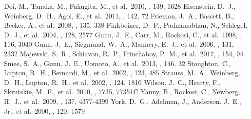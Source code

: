 \begin{thebibliography}{}
 Doi, M., Tanaka, M., Fukugita, M., et al.\ 2010, \aj, 139, 1628 %
 Eisenstein, D.~J., Weinberg, D.~H., Agol, E., et al.\ 2011, \aj, 142, 72 %
 Frieman, J.~A., Bassett, B., Becker, A., et al.\ 2008, \aj, 135, 338 %
 Finkbeiner, D.~P., Padmanabhan, N., Schlegel, D.~J., et al.\ 2004, \aj, 128, 2577 %
 Gunn, J.~E., Carr, M., Rockosi, C., et al.\ 1998, \aj, 116, 3040 %
 Gunn, J.~E., Siegmund, W.~A., Mannery, E.~J., et al.\ 2006, \aj, 131, 2332 %
 Majewski, S.~R., Schiavon, R.~P., Frinchaboy, P.~M., et al.\ 2017, \aj, 154, 94 %
 Smee, S.~A., Gunn, J.~E., Uomoto, A., et al.\ 2013, \aj, 146, 32 %
 Stoughton, C., Lupton, R.~H., Bernardi, M., et al.\ 2002, \aj, 123, 485 %
 Strauss, M.~A., Weinberg, D.~H., Lupton, R.~H., et al.\ 2002, \aj, 124, 1810 %
 Wilson, J.~C., Hearty, F., Skrutskie, M.~F., et al.\ 2010, \procspie, 7735, 77351C %
 Yanny, B., Rockosi, C., Newberg, H.~J., et al.\ 2009, \aj, 137, 4377-4399 %
 York, D.~G., Adelman, J., Anderson, J.~E., Jr., et al.\ 2000, \aj, 120, 1579 %
\end{thebibliography}